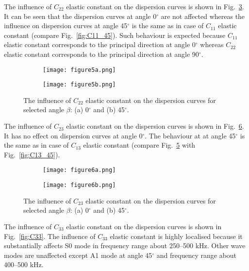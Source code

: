{ The influence of \(C_{22}\) elastic constant on the dispersion curves is shown in Fig.~\ref{fig:C22}.
 It can be seen that the dispersion curves at angle 0\(^{\circ}\) are not affected whereas the influence on dispersion curves at  angle 45\(^{\circ}\) is the same as in case of  \(C_{11}\) elastic constant (compare Fig.~\ref{fig:C11_45}). 
 Such behaviour is expected because \(C_{11}\) elastic constant corresponds to the principal direction at angle 0\(^{\circ}\) whereas \(C_{22}\) elastic constant corresponds to the principal direction at angle 90\(^{\circ}\).
 
 \begin{figure} [h!]
 	\centering
 	\begin{subfigure}[b]{0.47\textwidth}
 		\centering
 		\texttt{[image: figure5a.png]}
 		\caption{}
 		\label{fig:C22_0}
 	\end{subfigure}
 	\hfill
 	\begin{subfigure}[b]{0.47\textwidth}
 		\centering
 		\texttt{[image: figure5b.png]}
 		\caption{}
 		\label{fig:C22_45}
 	\end{subfigure}
 	\caption{The influence of \(C_{22}\) elastic constant on the dispersion curves for selected angle \(\beta\): (a) 0\(^{\circ}\) and (b) 45\(^{\circ}\).} 
 	\label{fig:C22}
 \end{figure}
 
 The influence of \(C_{23}\) elastic constant on the dispersion curves is shown in Fig.~\ref{fig:C23}.
 It has no effect on dispersion curves at angle 0\(^{\circ}\).
 The behaviour at at angle 45\(^{\circ}\) is the same as in case of \(C_{13}\) elastic constant (compare Fig.~\ref{fig:C23_45} with Fig.~\ref{fig:C13_45}).
 
 \begin{figure} [h!]
 	\centering
 	\begin{subfigure}[b]{0.47\textwidth}
 		\centering
 		\texttt{[image: figure6a.png]}
 		\caption{}
 		\label{fig:C23_0}
 	\end{subfigure}
 	\hfill
 	\begin{subfigure}[b]{0.47\textwidth}
 		\centering
 		\texttt{[image: figure6b.png]}
 		\caption{}
 		\label{fig:C23_45}
 	\end{subfigure}
 	\caption{The influence of \(C_{23}\) elastic constant on the dispersion curves for selected angle \(\beta\): (a) 0\(^{\circ}\) and (b) 45\(^{\circ}\).} 
 	\label{fig:C23}
 \end{figure}
 
 The influence of \(C_{33}\) elastic constant on the dispersion curves is shown in Fig.~\ref{fig:C33}.
 The influence of \(C_{33}\) elastic constant is highly localised because it substantially affects S0 mode in frequency range about 250--500 kHz.
 Other wave modes are unaffected except A1 mode at angle  45\(^{\circ}\) and frequency  range about 400--500 kHz.
 
}
